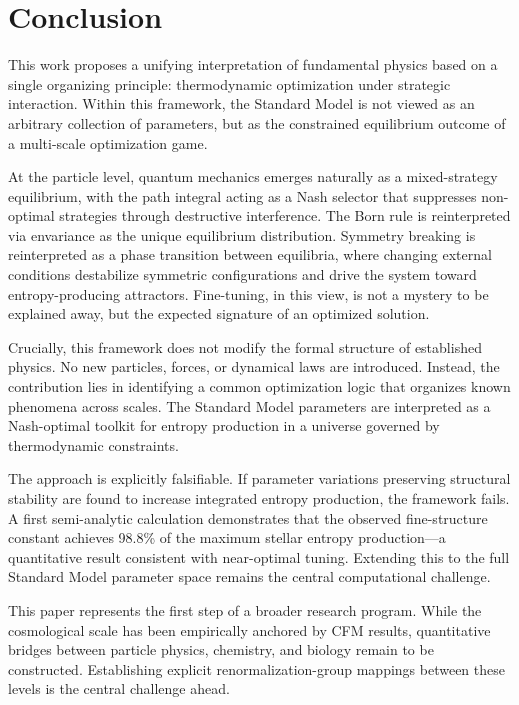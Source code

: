 \documentclass[12pt,a4paper]{article}
\theoremstyle{remark}
\begin{document}
\section{Conclusion}
\label{sec:conclusion}

This work proposes a unifying interpretation of fundamental physics based on a single organizing principle: thermodynamic optimization under strategic interaction. Within this framework, the Standard Model is not viewed as an arbitrary collection of parameters, but as the constrained equilibrium outcome of a multi-scale optimization game.

At the particle level, quantum mechanics emerges naturally as a mixed-strategy equilibrium, with the path integral acting as a Nash selector that suppresses non-optimal strategies through destructive interference. The Born rule is reinterpreted via envariance as the unique equilibrium distribution. Symmetry breaking is reinterpreted as a phase transition between equilibria, where changing external conditions destabilize symmetric configurations and drive the system toward entropy-producing attractors. Fine-tuning, in this view, is not a mystery to be explained away, but the expected signature of an optimized solution.

Crucially, this framework does not modify the formal structure of established physics. No new particles, forces, or dynamical laws are introduced. Instead, the contribution lies in identifying a common optimization logic that organizes known phenomena across scales. The Standard Model parameters are interpreted as a Nash-optimal toolkit for entropy production in a universe governed by thermodynamic constraints.

The approach is explicitly falsifiable. If parameter variations preserving structural stability are found to increase integrated entropy production, the framework fails. A first semi-analytic calculation demonstrates that the observed fine-structure constant achieves 98.8\% of the maximum stellar entropy production---a quantitative result consistent with near-optimal tuning. Extending this to the full Standard Model parameter space remains the central computational challenge.

This paper represents the first step of a broader research program. While the cosmological scale has been empirically anchored by CFM results, quantitative bridges between particle physics, chemistry, and biology remain to be constructed. Establishing explicit renormalization-group mappings between these levels is the central challenge ahead.
\end{document}
